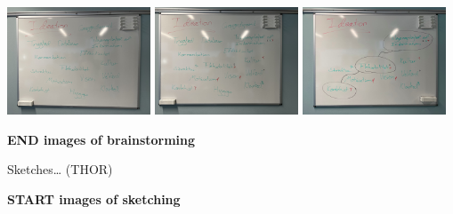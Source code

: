 \includegraphics[width=0.32\textwidth,height=\textheight]{./figures/brainstorm_image1.jpg}
\includegraphics[width=0.32\textwidth,height=\textheight]{./figures/brainstorm_image2.jpg}
\includegraphics[width=0.32\textwidth,height=\textheight]{./figures/brainstorm_image3.jpg}

\textbf{END images of brainstorming}

Sketches\ldots{} (THOR)

\textbf{START images of sketching}

